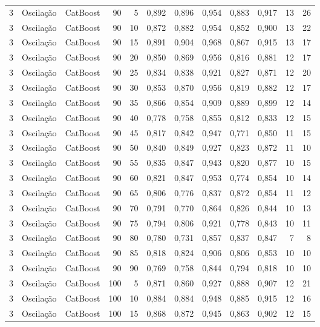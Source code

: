 \begin{longtable}{@{}rllrrrrrrrrr@{}}
3 & Oscilação & CatBoost & 90 & 5 & 0,892 & 0,896 & 0,954 & 0,883 & 0,917 & 13 & 26 \\
3 & Oscilação & CatBoost & 90 & 10 & 0,872 & 0,882 & 0,954 & 0,852 & 0,900 & 13 & 22 \\
3 & Oscilação & CatBoost & 90 & 15 & 0,891 & 0,904 & 0,968 & 0,867 & 0,915 & 13 & 17 \\
3 & Oscilação & CatBoost & 90 & 20 & 0,850 & 0,869 & 0,956 & 0,816 & 0,881 & 12 & 17 \\
3 & Oscilação & CatBoost & 90 & 25 & 0,834 & 0,838 & 0,921 & 0,827 & 0,871 & 12 & 20 \\
3 & Oscilação & CatBoost & 90 & 30 & 0,853 & 0,870 & 0,956 & 0,819 & 0,882 & 12 & 17 \\
3 & Oscilação & CatBoost & 90 & 35 & 0,866 & 0,854 & 0,909 & 0,889 & 0,899 & 12 & 14 \\
3 & Oscilação & CatBoost & 90 & 40 & 0,778 & 0,758 & 0,855 & 0,812 & 0,833 & 12 & 15 \\
3 & Oscilação & CatBoost & 90 & 45 & 0,817 & 0,842 & 0,947 & 0,771 & 0,850 & 11 & 15 \\
3 & Oscilação & CatBoost & 90 & 50 & 0,840 & 0,849 & 0,927 & 0,823 & 0,872 & 11 & 10 \\
3 & Oscilação & CatBoost & 90 & 55 & 0,835 & 0,847 & 0,943 & 0,820 & 0,877 & 10 & 15 \\
3 & Oscilação & CatBoost & 90 & 60 & 0,821 & 0,847 & 0,953 & 0,774 & 0,854 & 10 & 14 \\
3 & Oscilação & CatBoost & 90 & 65 & 0,806 & 0,776 & 0,837 & 0,872 & 0,854 & 11 & 12 \\
3 & Oscilação & CatBoost & 90 & 70 & 0,791 & 0,770 & 0,864 & 0,826 & 0,844 & 10 & 13 \\
3 & Oscilação & CatBoost & 90 & 75 & 0,794 & 0,806 & 0,921 & 0,778 & 0,843 & 10 & 11 \\
3 & Oscilação & CatBoost & 90 & 80 & 0,780 & 0,731 & 0,857 & 0,837 & 0,847 & 7 & 8 \\
3 & Oscilação & CatBoost & 90 & 85 & 0,818 & 0,824 & 0,906 & 0,806 & 0,853 & 10 & 10 \\
3 & Oscilação & CatBoost & 90 & 90 & 0,769 & 0,758 & 0,844 & 0,794 & 0,818 & 10 & 10 \\
3 & Oscilação & CatBoost & 100 & 5 & 0,871 & 0,860 & 0,927 & 0,888 & 0,907 & 12 & 21 \\
3 & Oscilação & CatBoost & 100 & 10 & 0,884 & 0,884 & 0,948 & 0,885 & 0,915 & 12 & 16 \\
3 & Oscilação & CatBoost & 100 & 15 & 0,868 & 0,872 & 0,945 & 0,863 & 0,902 & 12 & 15 \\

\end{longtable}
